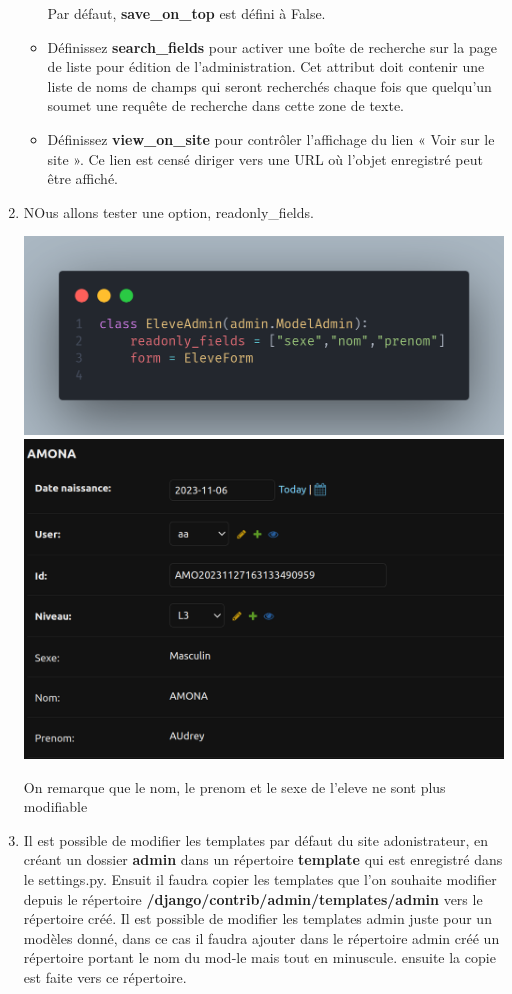\documentclass[11pt,a4paper]{article}
\begin{document}
\begin{enumerate}
\begin{itemize}
    Par défaut, \textbf{save\_on\_top} est défini à False.
		\item Définissez \textbf{search\_fields} pour activer une boîte de recherche sur la page de liste pour édition de l’administration. Cet attribut doit contenir une liste de noms de champs qui seront recherchés chaque fois que quelqu’un soumet une requête de recherche dans cette zone de texte.
		\item Définissez \textbf{view\_on\_site} pour contrôler l’affichage du lien « Voir sur le site ». Ce lien est censé diriger vers une URL où l’objet enregistré peut être affiché.
		\end{itemize}
	\item NOus allons tester une option, readonly\_fields.
		\begin{center}
			\includegraphics[scale=0.2]{images/reado.png}
						\includegraphics[scale=0.2]{images/read.png}
		\end{center}
		On remarque que le nom, le prenom et le sexe de l'eleve ne sont plus modifiable
		\item Il est possible de modifier les templates par défaut du site adonistrateur, en créant un dossier \textbf{admin} dans un répertoire \textbf{template} qui est enregistré dans le settings.py. Ensuit il faudra copier les templates que l'on souhaite modifier depuis le répertoire \textbf{/django/contrib/admin/templates/admin} vers le répertoire créé. Il est possible de modifier les templates admin juste pour un modèles donné, dans ce cas il faudra ajouter dans le répertoire admin créé un répertoire portant le nom du mod-le mais tout en minuscule. ensuite la copie est faite vers ce répertoire. 

\end{enumerate}
\end{document}

